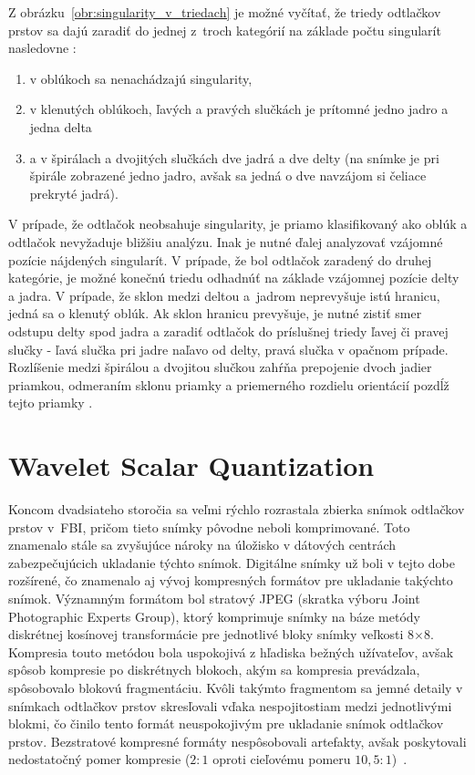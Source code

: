   Z obrázku~{\ref{obr:singularity_v_triedach}} je možné vyčítať, že triedy odtlačkov prstov sa dajú zaradiť do jednej z~troch kategórií na základe počtu
  singularít nasledovne \cite{Handbook}:
  \begin{enumerate}
    \item v oblúkoch sa nenachádzajú singularity,
    \item v klenutých oblúkoch, ľavých a pravých slučkách je prítomné jedno jadro a jedna delta
    \item a v špirálach a dvojitých slučkách dve jadrá a dve delty (na snímke je pri špirále zobrazené jedno jadro, avšak sa jedná o dve navzájom si čeliace
    prekryté jadrá).
  \end{enumerate}
  V prípade, že odtlačok neobsahuje singularity, je priamo klasifikovaný ako oblúk a odtlačok nevyžaduje bližšiu analýzu. Inak je nutné ďalej analyzovať
  vzájomné pozície nájdených singularít. V prípade, že bol odtlačok zaradený do druhej kategórie, je možné konečnú triedu odhadnúť na základe vzájomnej pozície
  delty a jadra. V prípade, že sklon medzi deltou a~jadrom neprevyšuje istú hranicu, jedná sa o klenutý oblúk. Ak sklon hranicu prevyšuje, je nutné zistiť smer
  odstupu delty spod jadra a zaradiť odtlačok do príslušnej triedy ľavej či pravej slučky - ľavá slučka pri jadre naľavo od delty, pravá slučka v opačnom
  prípade. Rozlíšenie medzi špirálou a dvojitou slučkou zahŕňa prepojenie dvoch jadier priamkou, odmeraním sklonu priamky a priemerného rozdielu orientácií
  pozdĺž tejto priamky \cite{Handbook}.

\chapter{Wavelet Scalar Quantization} \label{kap:wsq}
  Koncom dvadsiateho storočia sa veľmi rýchlo rozrastala zbierka snímok odtlačkov prstov v~FBI, pričom tieto snímky pôvodne neboli komprimované.
  Toto znamenalo stále sa zvyšujúce nároky na úložisko v dátových centrách zabezpečujúcich ukladanie týchto snímok. Digitálne snímky už boli v tejto dobe
  rozšírené, čo znamenalo aj vývoj kompresných formátov pre ukladanie takýchto snímok. Významným formátom bol stratový JPEG (skratka výboru Joint Photographic
  Experts Group), ktorý komprimuje snímky na báze metódy diskrétnej kosínovej transformácie pre jednotlivé bloky snímky veľkosti $8$$\times{}$$8$. Kompresia touto
  metódou bola uspokojivá z hľadiska bežných užívateľov, avšak spôsob kompresie po diskrétnych blokoch, akým sa kompresia prevádzala, spôsobovalo blokovú
  fragmentáciu. Kvôli takýmto fragmentom sa jemné detaily v snímkach odtlačkov prstov skresľovali vďaka nespojitostiam medzi jednotlivými blokmi,
  čo činilo tento formát neuspokojivým pre ukladanie snímok odtlačkov prstov. Bezstratové kompresné formáty nespôsobovali artefakty, avšak poskytovali
  nedostatočný pomer kompresie ($2:1$ oproti cieľovému pomeru $10,5:1$)~{\cite{Handbook}}.
  

